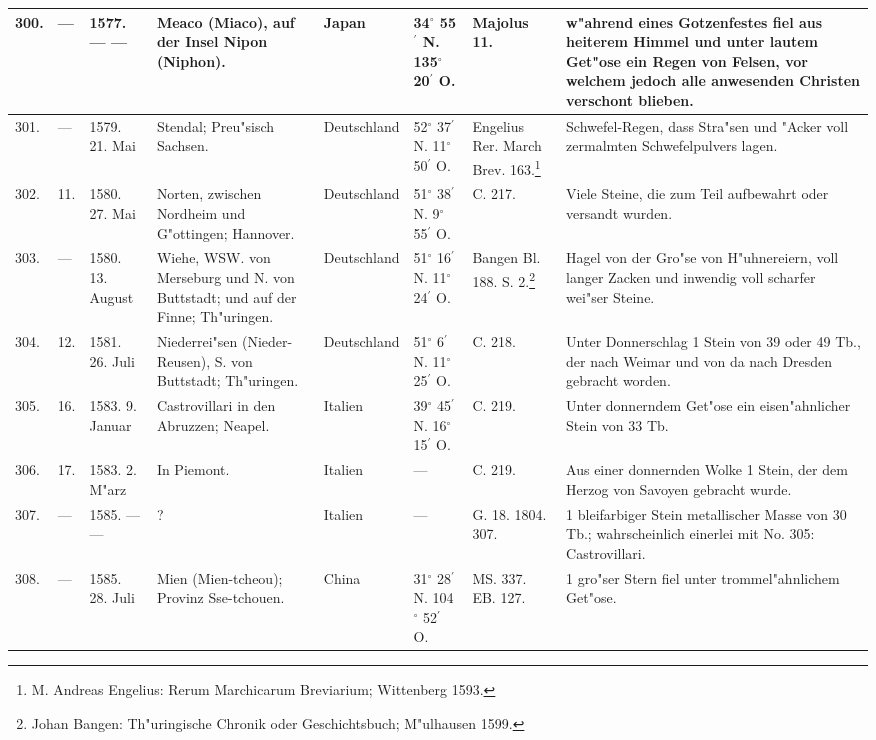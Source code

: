 \documentclass[a4paper, 8pt, oneside, polutonikogreek, german]{article}
\begin{document}
\begin{center}
\begin{longtable}{| p{5mm} | p{3mm} | p{15mm} | p{25mm} | p{20mm} | p{14mm} | p{17mm} | p{24mm} |}
        300. & --- & 1577. --- --- & Meaco (Miaco), auf der Insel Nipon (Niphon). & Japan & 34$^\circ$ 55$^\prime$ N. 135$^\circ$ 20$^\prime$ O. & Majolus 11. & w"ahrend eines Gotzenfestes fiel aus heiterem Himmel und unter lautem Get"ose ein Regen von Felsen, vor welchem jedoch alle anwesenden Christen verschont blieben. \\ \hline
        301. & --- & 1579. 21. Mai & Stendal; Preu"sisch Sachsen. & Deutschland & 52$^\circ$ 37$^\prime$ N. 11$^\circ$ 50$^\prime$ O. & Engelius Rer. March Brev. 163.\footnote{M. Andreas Engelius: Rerum Marchicarum Breviarium; Wittenberg 1593.} & Schwefel-Regen, dass Stra"sen und "Acker voll zermalmten Schwefelpulvers lagen. \\ \hline
        302. & 11. & 1580. 27. Mai & Norten, zwischen Nordheim und G"ottingen; Hannover. & Deutschland & 51$^\circ$ 38$^\prime$ N. 9$^\circ$ 55$^\prime$ O. & C. 217. & Viele Steine, die zum Teil aufbewahrt oder versandt wurden. \\ \hline
        303. & --- & 1580. 13. August & Wiehe, WSW. von Merseburg und N. von Buttstadt; und auf der Finne; Th"uringen. & Deutschland & 51$^\circ$ 16$^\prime$ N. 11$^\circ$ 24$^\prime$ O. & Bangen Bl. 188. S. 2.\footnote{Johan Bangen: Th"uringische Chronik oder Geschichtsbuch; M"ulhausen 1599.} & Hagel von der Gro"se von H"uhnereiern, voll langer Zacken und inwendig voll scharfer wei"ser Steine. \\ \hline
        304. & 12. & 1581. 26. Juli & Niederrei"sen (Nieder-Reusen), S. von Buttstadt; Th"uringen. & Deutschland & 51$^\circ$ 6$^\prime$ N. 11$^\circ$ 25$^\prime$ O. & C. 218. & Unter Donnerschlag 1 Stein von 39 oder 49 Tb., der nach Weimar und von da nach Dresden gebracht worden. \\ \hline
        305. & 16. & 1583. 9. Januar & Castrovillari in den Abruzzen; Neapel. & Italien & 39$^\circ$ 45$^\prime$ N. 16$^\circ$ 15$^\prime$ O. & C. 219. & Unter donnerndem Get"ose ein eisen"ahnlicher Stein von 33 Tb. \\ \hline
        306. & 17. & 1583. 2. M"arz & In Piemont. & Italien & --- & C. 219. & Aus einer donnernden Wolke 1 Stein, der dem Herzog von Savoyen gebracht wurde. \\ \hline
        307. & --- & 1585. --- --- & ? & Italien & --- & G. 18. 1804. 307. & 1 bleifarbiger Stein metallischer Masse von 30 Tb.; wahrscheinlich einerlei mit No. 305: Castrovillari. \\ \hline
        308. & --- & 1585. 28. Juli & Mien (Mien-tcheou); Provinz Sse-tchouen. & China & 31$^\circ$ 28$^\prime$ N. 104$^\circ$ 52$^\prime$ O. & MS. 337. EB. 127. & 1 gro"ser Stern fiel unter trommel"ahnlichem Get"ose. \\ \hline

\end{longtable}
\end{center}
\end{document}
